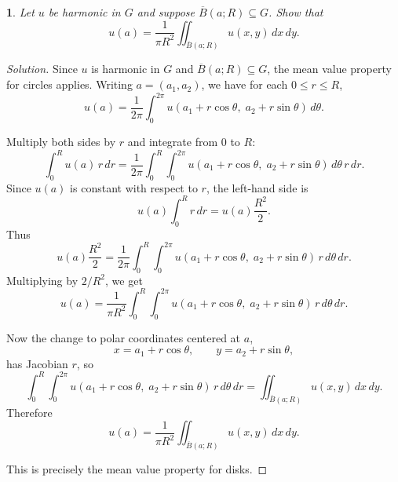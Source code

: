 \documentclass[12pt, a4paper]{report}
\theoremstyle{spaced}
\newtheorem{exercise}{}
\newcommand{\setexercise}[1]{\setcounter{exercise}{#1-1}}
\begin{document}
\setexercise{6}
\begin{exercise}
	Let $u$ be harmonic in $G$ and suppose $\overline{B}(a;R)\subseteq G$. Show that
	\[
		u(a)=\frac{1}{\pi R^2}\iint_{\overline{B}(a;R)} u(x,y)\,dx\,dy.
	\]
\end{exercise}
\begin{proof}[Solution]
	Since \(u\) is harmonic in \(G\) and \(\overline{B}(a;R)\subseteq G\), the mean value property for circles applies. Writing \(a=(a_1,a_2)\), we have for each \(0\le r\le R\),
	\[
		u(a)=\frac{1}{2\pi}\int_0^{2\pi} u(a_1+r\cos\theta,\; a_2+r\sin\theta)\,d\theta.
	\]

	Multiply both sides by \(r\) and integrate from \(0\) to \(R\):
	\[
		\int_0^R u(a)\,r\,dr
		=
		\frac{1}{2\pi}\int_0^R\int_0^{2\pi}
		u(a_1+r\cos\theta,\; a_2+r\sin\theta)\,d\theta\, r\,dr.
	\]
	Since \(u(a)\) is constant with respect to \(r\), the left-hand side is
	\[
		u(a)\int_0^R r\,dr = u(a)\frac{R^2}{2}.
	\]
	Thus
	\[
		u(a)\frac{R^2}{2}
		=
		\frac{1}{2\pi}\int_0^R\int_0^{2\pi}
		u(a_1+r\cos\theta,\; a_2+r\sin\theta)\, r\,d\theta\,dr.
	\]
	Multiplying by \(2/R^2\), we get
	\[
		u(a)
		=
		\frac{1}{\pi R^2}\int_0^R\int_0^{2\pi}
		u(a_1+r\cos\theta,\; a_2+r\sin\theta)\, r\,d\theta\,dr.
	\]

	Now the change to polar coordinates centered at \(a\),
	\[
		x=a_1+r\cos\theta,\qquad y=a_2+r\sin\theta,
	\]
	has Jacobian \(r\), so
	\[
		\int_0^R\int_0^{2\pi}
		u(a_1+r\cos\theta,\; a_2+r\sin\theta)\, r\,d\theta\,dr
		=
		\iint_{\overline{B}(a;R)} u(x,y)\,dx\,dy.
	\]
	Therefore
	\[
		u(a)=\frac{1}{\pi R^2}\iint_{\overline{B}(a;R)} u(x,y)\,dx\,dy.
	\]

	This is precisely the mean value property for disks.
\end{proof}
\end{document}
